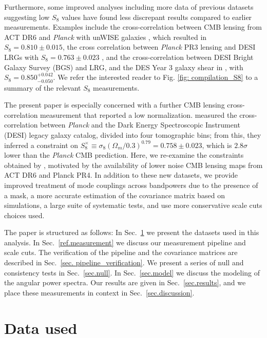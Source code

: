 \documentclass[twocolumn]{aastex631}
\begin{document}
Furthermore, some improved analyses including more data of previous datasets suggesting low $S_8$ values have found less discrepant results compared to earlier measurements. Examples include the cross-correlation between CMB lensing from ACT DR6 and \textit{Planck} with unWISE galaxies \citep{farren2023atacama}, which resulted in $S_8=0.810\pm0.015$, the cross correlation between \textit{Planck} PR3 lensing and DESI LRGs with  $S_8=0.763\pm0.023$ \citep{Sailer2024,Kim2024}, and the cross-correlation between DESI Bright Galaxy Survey (BGS) and LRG, and the DES Year 3 galaxy shear in \cite{2024arXiv240704795C}, with $S_8=0.850^{+0.042}_{-0.050}$. We refer the interested reader to Fig. \ref{fig: compilation_S8} to a summary of the relevant $S_8$ measurements.

The present paper is especially concerned with
a further CMB lensing cross-correlation measurement that reported a low normalization. \cite{hang2021}  measured the cross-correlation between \textit{Planck } and the Dark Energy Spectroscopic Instrument
(DESI) legacy galaxy catalog, divided into four tomographic bins; from this, they inferred a constraint on $S^{\times}_8\equiv\sigma_8(\Omega_m/0.3)^{0.79}=0.758\pm0.023$, which is $2.8\sigma$ lower than the \textit{Planck} CMB prediction. Here, we re-examine the constraints obtained by \cite{hang2021},  motivated by the availability of lower noise CMB lensing maps from ACT DR6 and Planck PR4. In addition to these new datasets, we provide improved treatment of mode couplings across bandpowers due to the presence of a mask, a more accurate estimation of the covariance matrix based on simulations, a large suite of systematic tests, and use more conservative scale cuts choices used.

The paper is structured as follows: In Sec.~\ref{data} we present the datasets used in this analysis. In Sec.~\ref{ref.measurement} we discuss our measurement pipeline and scale cuts.  The verification of the pipeline and the covariance matrices are described in Sec.~\ref{sec. pipeline_verification}. We present a series of null and consistency tests in Sec.~\ref{sec.null}. In Sec.~\ref{sec.model} we discuss the modeling of the angular power spectra. Our results are given in Sec.~\ref{sec.results}, and we place these measurements in context in Sec.~\ref{sec.discussion}.

\section{Data used} \label{data}
\end{document}
